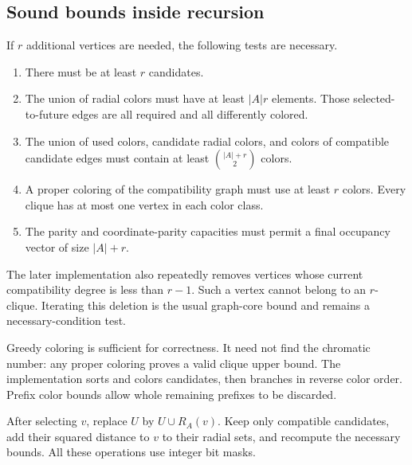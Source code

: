 \documentclass[11pt,letterpaper]{article}
\theoremstyle{definition}
\begin{document}
\subsection{Sound bounds inside recursion}
If \(r\) additional vertices are needed, the following tests are necessary.

\begin{enumerate}
\item There must be at least \(r\) candidates.
\item The union of radial colors must have at least \(|A|r\) elements.
Those selected-to-future edges are all required and all differently colored.
\item The union of used colors, candidate radial colors, and colors of
compatible candidate edges must contain at least \(\binom{|A|+r}{2}\)
colors.
\item A proper coloring of the compatibility graph must use at least
\(r\) colors. Every clique has at most one vertex in each color class.
\item The parity and coordinate-parity capacities must permit a final
occupancy vector of size \(|A|+r\).
\end{enumerate}

The later implementation also repeatedly removes vertices whose
current compatibility degree is less than \(r-1\). Such a vertex
cannot belong to an \(r\)-clique. Iterating this deletion is the usual
graph-core bound and remains a necessary-condition test.

Greedy coloring is sufficient for correctness. It need not find the
chromatic number: any proper coloring proves a valid clique upper bound.
The implementation sorts and colors candidates, then branches in reverse
color order. Prefix color bounds allow whole remaining prefixes to be
discarded.

After selecting \(v\), replace \(U\) by \(U\cup R_A(v)\). Keep only
compatible candidates, add their squared distance to \(v\) to their
radial sets, and recompute the necessary bounds. All these operations
use integer bit masks.
\end{document}
